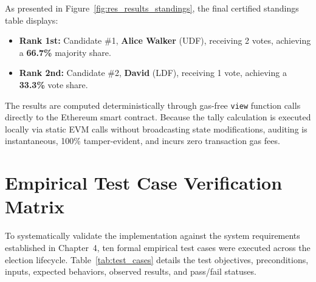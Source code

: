 \documentclass[12pt,a4paper]{report}
\begin{document}
As presented in Figure~\ref{fig:res_results_standings}, the final certified standings table displays:
\begin{itemize}
    \item \textbf{Rank 1st:} Candidate \#1, \textbf{Alice Walker} (UDF), receiving 2 votes, achieving a \textbf{66.7\%} majority share.
    \item \textbf{Rank 2nd:} Candidate \#2, \textbf{David} (LDF), receiving 1 vote, achieving a \textbf{33.3\%} vote share.
\end{itemize}
The results are computed deterministically through gas-free \texttt{view} function calls directly to the Ethereum smart contract. Because the tally calculation is executed locally via static EVM calls without broadcasting state modifications, auditing is instantaneous, 100\% tamper-evident, and incurs zero transaction gas fees.

\section{Empirical Test Case Verification Matrix}
To systematically validate the implementation against the system requirements established in Chapter~4, ten formal empirical test cases were executed across the election lifecycle. Table~\ref{tab:test_cases} details the test objectives, preconditions, inputs, expected behaviors, observed results, and pass/fail statuses.
\end{document}
